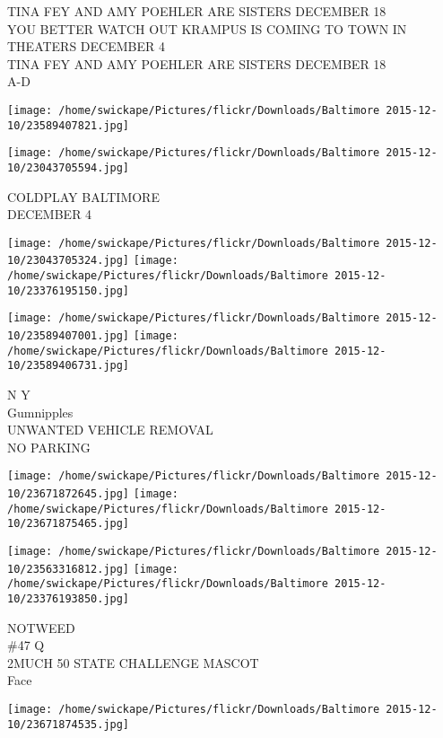 \documentclass[10pt,letterpaper]{article}
\begin{document}
TINA FEY AND AMY POEHLER ARE SISTERS DECEMBER 18\\
YOU BETTER WATCH OUT KRAMPUS IS COMING TO TOWN IN THEATERS DECEMBER 4\\
TINA FEY AND AMY POEHLER ARE SISTERS DECEMBER 18\\
A{-}D\\
\pagebreak

\texttt{[image: /home/swickape/Pictures/flickr/Downloads/Baltimore 2015-12-10/23589407821.jpg]}

\vspace{0.25in}
\texttt{[image: /home/swickape/Pictures/flickr/Downloads/Baltimore 2015-12-10/23043705594.jpg]}

COLDPLAY BALTIMORE\\
DECEMBER 4\\
\pagebreak

\texttt{[image: /home/swickape/Pictures/flickr/Downloads/Baltimore 2015-12-10/23043705324.jpg]}
\texttt{[image: /home/swickape/Pictures/flickr/Downloads/Baltimore 2015-12-10/23376195150.jpg]}

\texttt{[image: /home/swickape/Pictures/flickr/Downloads/Baltimore 2015-12-10/23589407001.jpg]}
\texttt{[image: /home/swickape/Pictures/flickr/Downloads/Baltimore 2015-12-10/23589406731.jpg]}

N Y\\
Gumnipples\\
UNWANTED VEHICLE REMOVAL\\
NO PARKING\\
\pagebreak

\texttt{[image: /home/swickape/Pictures/flickr/Downloads/Baltimore 2015-12-10/23671872645.jpg]}
\texttt{[image: /home/swickape/Pictures/flickr/Downloads/Baltimore 2015-12-10/23671875465.jpg]}

\texttt{[image: /home/swickape/Pictures/flickr/Downloads/Baltimore 2015-12-10/23563316812.jpg]}
\texttt{[image: /home/swickape/Pictures/flickr/Downloads/Baltimore 2015-12-10/23376193850.jpg]}

NOTWEED\\
\#47 Q\\
2MUCH 50 STATE CHALLENGE MASCOT\\
Face\\
\pagebreak

\texttt{[image: /home/swickape/Pictures/flickr/Downloads/Baltimore 2015-12-10/23671874535.jpg]}
\end{document}
